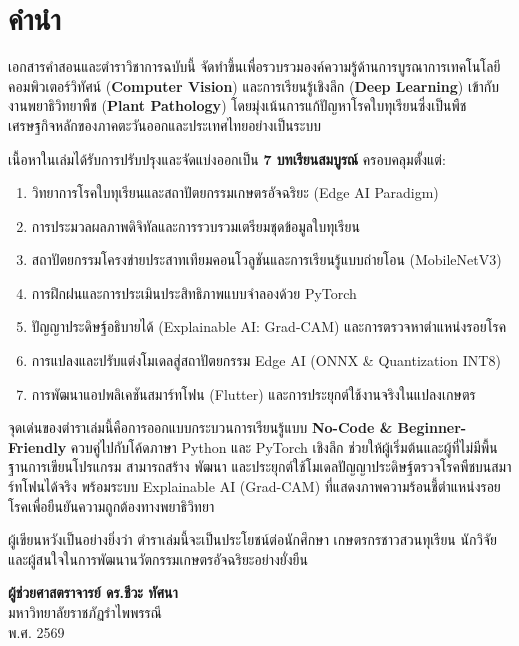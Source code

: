 \documentclass[12pt,twoside,openright]{book}
\begin{document}
\frontmatter
\chapter*{คำนำ}

เอกสารคำสอนและตำราวิชาการฉบับนี้ จัดทำขึ้นเพื่อรวบรวมองค์ความรู้ด้านการบูรณาการเทคโนโลยีคอมพิวเตอร์วิทัศน์ (\textbf{Computer Vision}) และการเรียนรู้เชิงลึก (\textbf{Deep Learning}) เข้ากับงานพยาธิวิทยาพืช (\textbf{Plant Pathology}) โดยมุ่งเน้นการแก้ปัญหาโรคใบทุเรียนซึ่งเป็นพืชเศรษฐกิจหลักของภาคตะวันออกและประเทศไทยอย่างเป็นระบบ

เนื้อหาในเล่มได้รับการปรับปรุงและจัดแบ่งออกเป็น \textbf{7 บทเรียนสมบูรณ์} ครอบคลุมตั้งแต่:
\begin{enumerate}[leftmargin=2em, itemsep=2pt]
    \item วิทยาการโรคใบทุเรียนและสถาปัตยกรรมเกษตรอัจฉริยะ (Edge AI Paradigm)
    \item การประมวลผลภาพดิจิทัลและการรวบรวมเตรียมชุดข้อมูลใบทุเรียน
    \item สถาปัตยกรรมโครงข่ายประสาทเทียมคอนโวลูชันและการเรียนรู้แบบถ่ายโอน (MobileNetV3)
    \item การฝึกฝนและการประเมินประสิทธิภาพแบบจำลองด้วย PyTorch
    \item ปัญญาประดิษฐ์อธิบายได้ (Explainable AI: Grad-CAM) และการตรวจหาตำแหน่งรอยโรค
    \item การแปลงและปรับแต่งโมเดลสู่สถาปัตยกรรม Edge AI (ONNX \& Quantization INT8)
    \item การพัฒนาแอปพลิเคชันสมาร์ทโฟน (Flutter) และการประยุกต์ใช้งานจริงในแปลงเกษตร
\end{enumerate}

จุดเด่นของตำราเล่มนี้คือการออกแบบกระบวนการเรียนรู้แบบ \textbf{No-Code \& Beginner-Friendly} ควบคู่ไปกับโค้ดภาษา Python และ PyTorch เชิงลึก ช่วยให้ผู้เริ่มต้นและผู้ที่ไม่มีพื้นฐานการเขียนโปรแกรม สามารถสร้าง พัฒนา และประยุกต์ใช้โมเดลปัญญาประดิษฐ์ตรวจโรคพืชบนสมาร์ทโฟนได้จริง พร้อมระบบ Explainable AI (Grad-CAM) ที่แสดงภาพความร้อนชี้ตำแหน่งรอยโรคเพื่อยืนยันความถูกต้องทางพยาธิวิทยา

ผู้เขียนหวังเป็นอย่างยิ่งว่า ตำราเล่มนี้จะเป็นประโยชน์ต่อนักศึกษา เกษตรกรชาวสวนทุเรียน นักวิจัย และผู้สนใจในการพัฒนานวัตกรรมเกษตรอัจฉริยะอย่างยั่งยืน

\vspace{1.5cm}
\begin{flushright}
\textbf{ผู้ช่วยศาสตราจารย์ ดร.ชีวะ ทัศนา}\\
มหาวิทยาลัยราชภัฏรำไพพรรณี\\
พ.ศ. 2569
\end{flushright}
\end{document}
